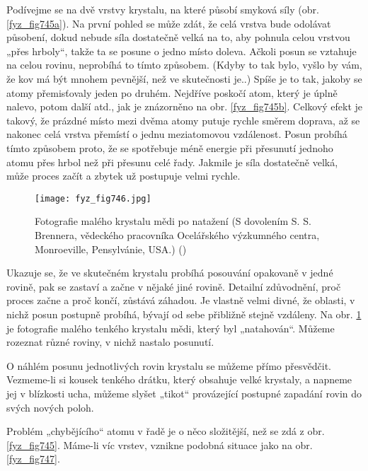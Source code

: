{    Podívejme se na dvě vrstvy krystalu, na které působí smyková síly (obr. \ref{fyz_fig745a}). Na 
    první pohled se může zdát, že celá vrstva bude odolávat působení, dokud nebude síla dostatečně 
    velká na to, aby pohnula celou vrstvou „přes hrboly“, takže ta se posune o jedno místo doleva. 
    Ačkoli posun se vztahuje na celou rovinu, neprobíhá to tímto způsobem. (Kdyby to tak bylo, 
    vyšlo by vám, že kov má být mnohem pevnější, než ve skutečnosti je..) Spíše je to tak, jakoby 
    se atomy přemisťovaly jeden po druhém. Nejdříve poskočí atom, který je úplně nalevo, potom 
    další atd., jak je znázorněno na obr. \ref{fyz_fig745b}. Celkový efekt je takový, že prázdné 
    místo mezi dvěma atomy putuje rychle směrem doprava, až se nakonec celá vrstva přemístí o jednu 
    meziatomovou vzdálenost. Posun probíhá tímto způsobem proto, že se spotřebuje méně energie při 
    přesunutí jednoho atomu přes hrbol než při přesunu celé řady. Jakmile je síla dostatečně velká, 
    může proces začít a zbytek už postupuje velmi rychle.
    
    
    \begin{figure}[ht!] %
      \centering
      \texttt{[image: fyz\_fig746.jpg]}
      \caption{Fotografie malého krystalu mědi po natažení (S dovolením S. S. Brennera, vědeckého 
               pracovníka Ocelářského výzkumného centra, Monroeville, Pensylvánie, USA.)
               (\cite[s.~552]{Feynman02})}
      \label{fyz_fig746}
    \end{figure}
    
    Ukazuje se, že ve skutečném krystalu probíhá posouvání opakovaně v jedné rovině, pak se zastaví 
    a začne v nějaké jiné rovině. Detailní zdůvodnění, proč proces začne a proč končí, zůstává 
    záhadou. Je vlastně velmi divné, že oblasti, v nichž posun postupně probíhá, bývají od sebe 
    přibližně stejně vzdáleny. Na obr. \ref{fyz_fig746} je fotografie malého tenkého krystalu mědi, 
    který byl „natahován“. Můžeme rozeznat různé roviny, v nichž nastalo posunutí.
    
    O náhlém posunu jednotlivých rovin krystalu se můžeme přímo přesvědčit. Vezmeme-li si kousek 
    tenkého drátku, který obsahuje velké krystaly, a napneme jej v blízkosti ucha, můžeme slyšet 
    „tikot“ provázející postupné zapadání rovin do svých nových poloh. 
    
    Problém „chybějícího“ atomu v řadě je o něco složitější, než se zdá z obr. \ref{fyz_fig745}. 
    Máme-li víc vrstev, vznikne podobná situace jako na obr. \ref{fyz_fig747}. 
    
}

